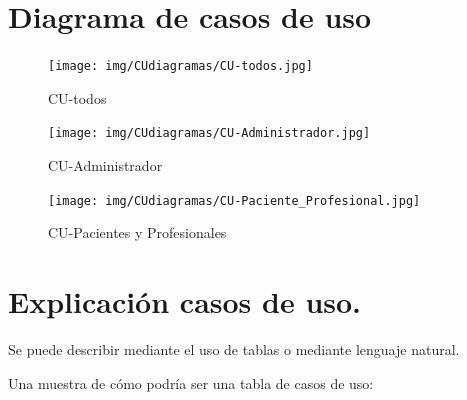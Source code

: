 \section{Diagrama de casos de uso}


\begin{figure}[h]
    \centering
    \texttt{[image: img/CUdiagramas/CU-todos.jpg]}
    \caption{CU-todos}
    \label{fig:CU-todos}
\end{figure}

\begin{figure}[h]
    \centering
    \texttt{[image: img/CUdiagramas/CU-Administrador.jpg]}
    \caption{CU-Administrador}
    \label{fig:CU-Administrador}
\end{figure}

\begin{figure}[h]
    \centering
    \texttt{[image: img/CUdiagramas/CU-Paciente\_Profesional.jpg]}
    \caption{CU-Pacientes y Profesionales}
    \label{fig:CU-Paciente_Profesional}
\end{figure}




\section{Explicación casos de uso.}

Se puede describir mediante el uso de tablas o mediante lenguaje natural.    

Una muestra de cómo podría ser una tabla de casos de uso:

